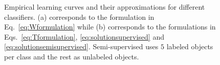 \documentclass[runningheads,a4paper]{llncs}\usepackage[]{graphicx}\usepackage[]{color}
\newenvironment{knitrout}{}{} %
\begin{document}
\begin{knitrout}
\color{fgcolor}\begin{figure}
\caption{Empirical learning curves and their approximations for different classifiers. (a) corresponds to the formulation in Eq.~\eqref{eq:Wformulation} while (b) corresponds to the formulations in Eqs.~\eqref{eq:Tformulation}, \eqref{eq:solutionsupervised} and \eqref{eq:solutionsemisupervised}. Semi-supervised uses $5$ labeled objects per class and the rest as unlabeled objects.}\label{fig:peaking-asymptotic}
\end{figure}


\end{knitrout}
\end{document}
